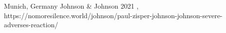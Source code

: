           {
            Munich, Germany
          }
          {
          }
          {
            Johnson \& Johnson
          }
          {
            2021
          }
          {
            ,
          }
          {
            https://nomoresilence.world/johnson/paul-zisper-johnson-johnson-severe-adverses-reaction/
          }

